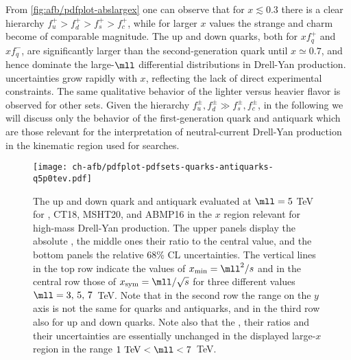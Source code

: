    From \cref{fig:afb/pdfplot-abslargex} one can observe that for
   $x\lesssim 0.3$ there is a clear hierarchy
$f_u^+>f_d^+ >f_s^+>f_c^+$, while for larger $x$ values the
   strange and charm \pdfs become of comparable magnitude.
   The up and down quarks, both for $xf^+_q$ and $xf^-_q$, are significantly larger
   than the second-generation quark \pdfs until $x\simeq 0.7$, and hence dominate the
   large-$\mll$ differential distributions in Drell-Yan production.
%
\pdf uncertainties grow rapidly with $x$, reflecting the lack
of direct experimental constraints.
%
The same qualitative behavior of the lighter versus heavier flavor \pdfs
is observed for other \pdf sets.
%
Given the hierarchy $f_u^\pm, f_d^\pm \gg f_s^\pm, f_c^\pm $, in the following
we will discuss only the behavior of the first-generation quark
and antiquark \pdfs which are those relevant for the interpretation
of neutral-current Drell-Yan production in the kinematic region used
for \bsm searches. 
      


\begin{figure}[!t]
 \centering
 \texttt{[image: ch-afb/pdfplot-pdfsets-quarks-antiquarks-q5p0tev.pdf]}
 \caption{\small The up and down quark and antiquark \pdfs evaluated at $\mll=5$ TeV
   for , CT18, MSHT20, and ABMP16 in the $x$ region relevant for
   high-mass Drell-Yan production. The upper panels display the absolute \pdfs,
   the middle ones their ratio to the central  value, and the bottom panels
   the relative 68\% CL uncertainties.
   The vertical lines in the top
   row indicate the values of  $x_{\rm min}=\mll^2/s$ and in the central
   row those of $x_{\rm  sym}=\mll/\sqrt{s}$
   for three
   different values  $\mll=3,\,5,\,7$~TeV.
   Note that in the second row the
   range on the $y$ axis is not the same for quarks and antiquarks,
   and in the third row also for up and down quarks.
   Note also that the
   \pdfs, their ratios and their uncertainties are essentially
   unchanged in the displayed large-$x$ region in the range $1~{\rm TeV}<\mll<7$~TeV.
}    
 \label{fig:afb/mll_dep_pdfs}
\end{figure}

